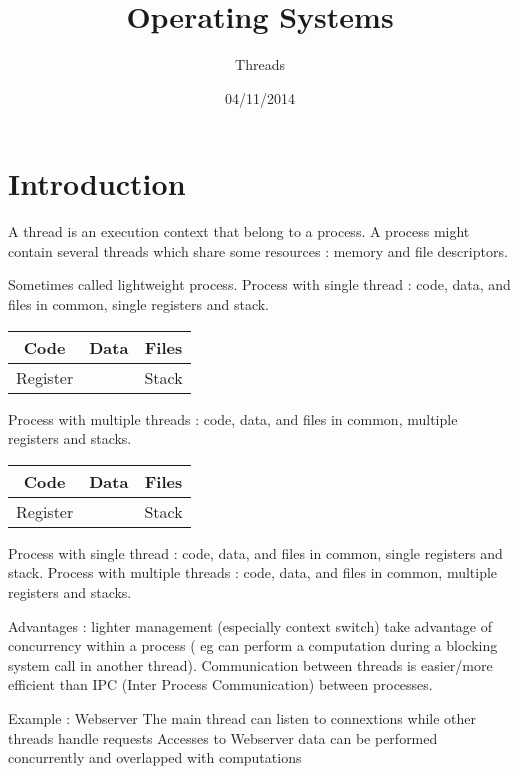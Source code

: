 \documentclass[a4paper,10pt]{article}
\title{Operating Systems}
\subtitle{Threads}
\author{}
\date{04/11/2014}
\begin{document}
\maketitle


\section{Introduction}

A thread is an execution context that belong to a process.
A process might contain several threads which share some resources : memory and file descriptors.

Sometimes called lightweight process.
Process with single thread : code, data, and files in common, single registers and stack. 
\begin{center}
\begin{tabular}{|ccc|}
\hline
	Code & Data & Files\\
	\hline
	Register & & Stack\\
	\hline
\end{tabular}

\end{center}
Process with multiple threads : code, data, and files in common, multiple registers and stacks.

\begin{center}
\begin{tabular}{|ccc|}
\hline
	Code & Data & Files\\
	\hline
	Register & & Stack\\
	\hline
\end{tabular}

\end{center}
Process with single thread : code, data, and files in common, single registers and stack.
Process with multiple threads : code, data, and files in common, multiple registers and stacks.

Advantages :
lighter management (especially context switch)
take advantage of concurrency within a process ( eg can perform a computation during a blocking system call in another thread).
Communication between threads is easier/more efficient than IPC (Inter Process Communication) between processes.

Example : Webserver
The main thread can listen to connextions while other threads handle requests
Accesses to Webserver data can be performed concurrently and overlapped with computations
\end{document}
